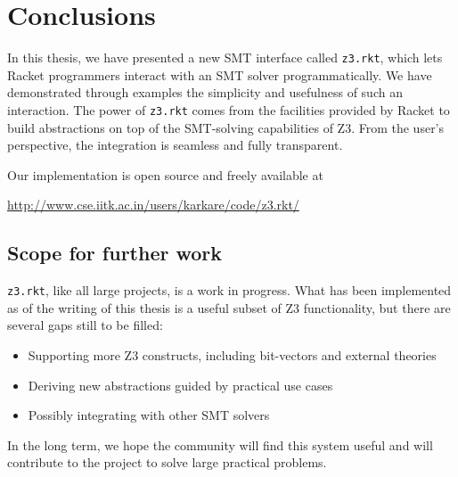 \chapter{Conclusions}

In this thesis, we have presented a new SMT interface called \texttt{z3.rkt},
which lets Racket programmers interact with an SMT solver programmatically. We
have demonstrated through examples the simplicity and usefulness of such an
interaction. The power of \texttt{z3.rkt} comes from the facilities provided
by Racket to build abstractions on top of the SMT-solving capabilities of Z3.
From the user's perspective, the integration is seamless and fully
transparent.

Our implementation is open source and freely available at
\begin{center}
\url{http://www.cse.iitk.ac.in/users/karkare/code/z3.rkt/}
\end{center}

\section{Scope for further work}

\texttt{z3.rkt}, like all large projects, is a work in progress. What has been
implemented as of the writing of this thesis is a useful subset of Z3
functionality, but there are several gaps still to be filled:

\begin{itemize}
\item Supporting more Z3 constructs, including bit-vectors and external theories
\item Deriving new abstractions guided by practical use cases
\item Possibly integrating with other SMT solvers
\end{itemize}

In the long term, we hope the community will find this system useful and will
contribute to the project to solve large practical problems.
